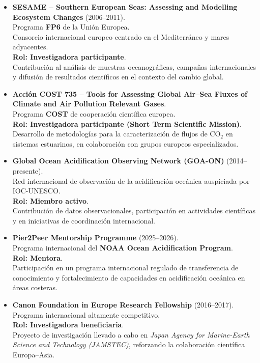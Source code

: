 \documentclass[11pt,a4paper]{article}
\begin{document}
\begin{itemize}[leftmargin=*]
    \item \textbf{SESAME -- Southern European Seas: Assessing and Modelling Ecosystem Changes} (2006--2011).\\
    Programa \textbf{FP6} de la Unión Europea.\\
    Consorcio internacional europeo centrado en el Mediterráneo y mares adyacentes.\\
    \textbf{Rol: Investigadora participante}.\\
    Contribución al análisis de muestras oceanográficas, campañas internacionales y difusión de resultados científicos en el contexto del cambio global.

    \item \textbf{Acción COST 735 -- Tools for Assessing Global Air--Sea Fluxes of Climate and Air Pollution Relevant Gases}.\\
    Programa \textbf{COST} de cooperación científica europea.\\
    \textbf{Rol: Investigadora participante (Short Term Scientific Mission)}.\\
    Desarrollo de metodologías para la caracterización de flujos de CO$_2$ en sistemas estuarinos, en colaboración con grupos europeos especializados.

    \item \textbf{Global Ocean Acidification Observing Network (GOA-ON)} (2014--presente).\\
    Red internacional de observación de la acidificación oceánica auspiciada por IOC-UNESCO.\\
    \textbf{Rol: Miembro activo}.\\
    Contribución de datos observacionales, participación en actividades científicas y en iniciativas de coordinación internacional.

    \item \textbf{Pier2Peer Mentorship Programme} (2025--2026).\\
    Programa internacional del \textbf{NOAA Ocean Acidification Program}.\\
    \textbf{Rol: Mentora}.\\
    Participación en un programa internacional regulado de transferencia de conocimiento y fortalecimiento de capacidades en acidificación oceánica en áreas costeras.

    \item \textbf{Canon Foundation in Europe Research Fellowship} (2016--2017).\\
    Programa internacional altamente competitivo.\\
    \textbf{Rol: Investigadora beneficiaria}.\\
    Proyecto de investigación llevado a cabo en \textit{Japan Agency for Marine-Earth Science and Technology (JAMSTEC)}, reforzando la colaboración científica Europa--Asia.


\end{itemize}
\end{document}
